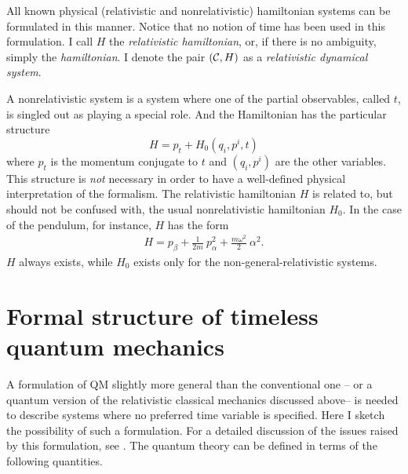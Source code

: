 \documentclass[10pt,nofootinbib]{revtex4}
\begin{document}
\begin{quotation}
\end{quotation}
All known physical (relativistic and nonrelativistic) hamiltonian systems can be formulated in
this manner.  Notice that no notion of time has been used in this formulation. 
I call $H$ the \emph{relativistic hamiltonian}, or, if
there is no ambiguity, simply the \emph{hamiltonian}.  I denote the pair $({\cal
C},H)$ as a {\em relativistic dynamical system}.  

A nonrelativistic system is a system where one of the partial observables,
called $t$,  is singled out as playing a special role. And the Hamiltonian has
the particular structure 
\begin{equation}
H=p_t+H_0(q_i,p^i,t)
\label{nonr}
\end{equation}
where $p_t$ is the momentum conjugate to 
$t$ and $(q_i,p^i)$ are the other variables. 
This structure is {\em not} necessary in order to have a
well-defined physical interpretation of the formalism.  The relativistic hamiltonian $H$ is related to, but should not be
confused with, the usual nonrelativistic hamiltonian $H_{0}$. In the case of the pendulum,
for instance, $H$ has the form
\begin{eqnarray} 
H=p_\beta+\frac{1}{2m}\ p_\alpha^2
+\frac{m\omega^2}{2}\ \alpha^2. 
\label{Hpendulum2}
\end{eqnarray} 
 $H$ always exists, while $H_{0}$ exists only for the
non-general-relativistic systems.

\section{Formal structure of timeless quantum mechanics}

A formulation of QM slightly more general than the conventional one --
 or a quantum version of the relativistic classical mechanics
 discussed above-- is needed to describe systems where no preferred time variable is specified.  Here I sketch the possibility of such a formulation.   For a detailed discussion of the issues raised by this formulation, see \cite{book}.  The quantum theory can be defined in terms of the following quantities.
 
\end{document}
